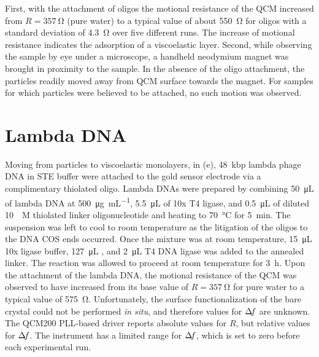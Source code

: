 First, with the attachment of oligos the motional resistance of the QCM
increased from $R=\SI{357}{\ohm}$ (pure water) to a typical value of about
\SI{550}{\ohm} for oligos with a standard deviation of \SI{4.3}{\ohm} over
five different runs.  The increase of motional resistance indicates the
adsorption of a viscoelastic layer.  Second, while observing the sample by
eye under a microscope, a handheld neodymium magnet was brought in
proximity to the sample.  In the absence of the oligo attachment, the
particles readily moved away from QCM surface towards the magnet.  For
samples for which particles were believed to be attached, no such motion
was observed.


\section{Lambda DNA}
Moving from particles to viscoelastic monolayers, in
(e), \SI{48}{kbp} lambda phage DNA in STE buffer were
attached to the gold sensor electrode via a complimentary thiolated oligo.
Lambda DNAs were prepared by combining \SI{50}{\micro\liter} of lambda DNA
at \SI{500}{\micro\gram\per\milli\liter}, \SI{5.5}{\micro\liter} of 10x T4
ligase, and \SI{0.5}{\micro\liter} of diluted \SI{10}{\micro\textsc{M}}
thiolated linker oligonucleotide and heating to \SI{70}{\celsius} for
\SI{5}{\minute}.  The suspension was left to cool to room temperature as
the litigation of the oligos to the DNA COS ends occurred. Once the mixture
was at room temperature, \SI{15}{\micro\liter} 10x ligase buffer,
\SI{127}{\micro\liter} , and \SI{2}{\micro\liter} T4 DNA ligase was
added to the annealed linker.  The reaction was allowed to proceed at room
temperature for \SI{3}{\hour}.  Upon the attachment of the lambda DNA, the
motional resistance of the QCM was observed to have increased from its base
value of $R=\SI{357}{\ohm}$ for pure water to a typical value of
\SI{575}{\ohm}.  Unfortunately, the surface functionalization of the bare
crystal could not be performed \textit{in situ}, and therefore values for
$\Delta\!f$ are unknown.  The QCM200 PLL-based driver reports absolute values for
$R$, but relative values for $\Delta\!f$.  The instrument has a limited range for
$\Delta\!f$, which is set to zero before each experimental run.

